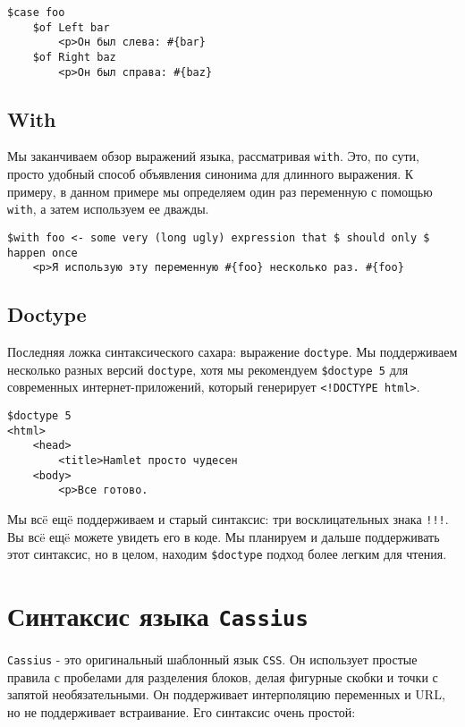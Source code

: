 \begin{lstlisting}
$case foo
    $of Left bar
        <p>Он был слева: #{bar}
    $of Right baz
        <p>Он был справа: #{baz}
\end{lstlisting}

\subsection{With}

Мы заканчиваем обзор выражений языка, рассматривая \texttt{with}. Это, по сути,
просто удобный способ объявления синонима для длинного выражения. К примеру, в
данном примере мы определяем один раз переменную с помощью \texttt{with}, а
затем используем ее дважды.

\begin{lstlisting}
$with foo <- some very (long ugly) expression that $ should only $ happen once
    <p>Я использую эту переменную #{foo} несколько раз. #{foo}
\end{lstlisting}

\subsection{Doctype}
Последняя ложка синтаксического сахара: выражение \texttt{doctype}. Мы
поддерживаем несколько разных версий \texttt{doctype}, хотя мы рекомендуем
\lstinline!$doctype 5! для современных интернет-приложений, который генерирует
\lstinline'<!DOCTYPE html>'.

\begin{lstlisting}
$doctype 5
<html>
    <head>
        <title>Hamlet просто чудесен
    <body>
        <p>Все готово.
\end{lstlisting}

\begin{remark}
    Мы всë ещë поддерживаем и старый синтаксис: три восклицательных знака
    \texttt{!!!}.  Вы всë ещë можете увидеть его в коде. Мы планируем и дальше
    поддерживать этот синтаксис, но в целом, находим \lstinline!$doctype!
    подход более легким для чтения.
\end{remark}

\section{Синтаксис языка \texttt{Cassius}}

\texttt{Cassius} - это оригинальный шаблонный язык \texttt{CSS}. Он использует
простые правила с пробелами для разделения блоков, делая фигурные скобки и
точки с запятой необязательными. Он поддерживает интерполяцию переменных и URL,
но не поддерживает встраивание. Его синтаксис очень простой:

